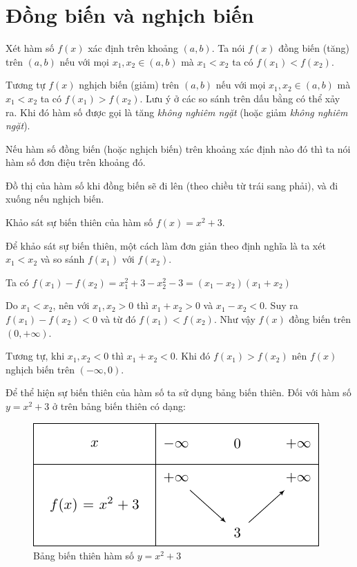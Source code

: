 \section{Đồng biến và nghịch biến}

\begin{definition}
    Xét hàm số $f(x)$ xác định trên khoảng $(a, b)$. Ta nói $f(x)$ đồng biến (tăng) trên $(a, b)$ 
    nếu với mọi $x_1, x_2 \in (a, b)$ mà $x_1 < x_2$ ta có $f(x_1) < f(x_2)$.
\end{definition}

Tương tự $f(x)$ nghịch biến (giảm) trên $(a, b)$ nếu với mọi $x_1, x_2 \in (a, b)$ mà 
$x_1 < x_2$ ta có $f(x_1) > f(x_2)$.
Lưu ý ở các so sánh trên dấu bằng có thể xảy ra. Khi đó hàm số
được gọi là tăng \textit{không nghiêm ngặt} (hoặc giảm \textit{không
nghiêm ngặt}).

Nếu hàm số đồng biến (hoặc nghịch biến) trên khoảng xác định nào đó thì ta
nói hàm số đơn điệu trên khoảng đó.

Đồ thị của hàm số khi đồng biến sẽ đi lên (theo chiều từ trái sang phải), và đi
xuống nếu nghịch biến.

\begin{example}
    Khảo sát sự biến thiên của hàm số $f(x) = x^2 + 3$.

    Để khảo sát sự biến thiên, một cách làm đơn giản theo định nghĩa
    là ta xét $x_1 < x_2$ và so sánh $f(x_1)$ với $f(x_2)$.

    Ta có $f(x_1) - f(x_2) = x_1^2 + 3 - x_2^2 - 3 = (x_1 - x_2)(x_1 + x_2)$

    Do $x_1 < x_2$, nên với $x_1, x_2 > 0$ thì $x_1 + x_2 > 0$ và
    $x_1 - x_2 < 0$. Suy ra $f(x_1) - f(x_2) < 0$ và từ đó $f(x_1) < f(x_2)$. Như
    vậy $f(x)$ đồng biến trên $(0, +\infty)$.

    Tương tự, khi $x_1, x_2 < 0$ thì $x_1 + x_2 < 0$. Khi đó $f(x_1) > f(x_2)$
    nên $f(x)$ nghịch biến trên $(-\infty, 0)$.
\end{example}

Để thể hiện sự biến thiên của hàm số ta sử dụng bảng biến thiên.
Đối với hàm số $y = x^2 + 3$ ở trên bảng biến thiên có dạng:

\begin{figure}[bh]
    \centering
    \includegraphics{pics/algebra/algebra1.pdf}
    \caption{Bảng biến thiên hàm số $y=x^2 + 3$}
\end{figure}

